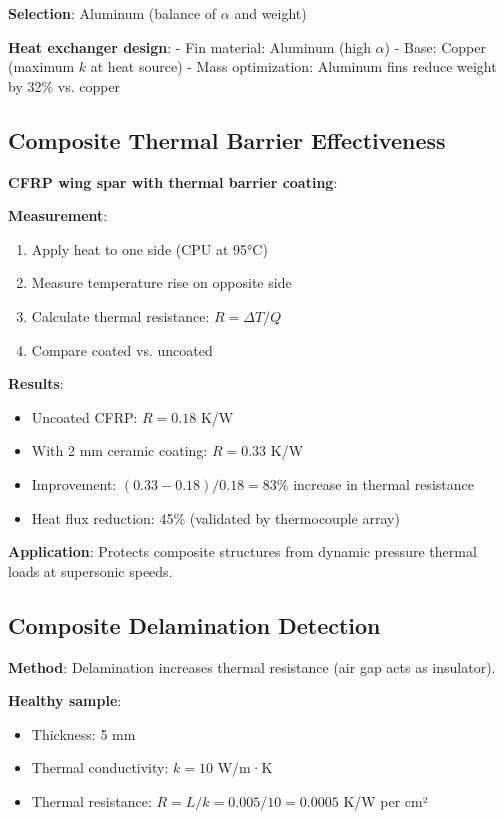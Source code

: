 \documentclass[12pt,a4paper]{article}
\begin{document}
\textbf{Selection}: Aluminum (balance of $\alpha$ and weight)

\textbf{Heat exchanger design}:
- Fin material: Aluminum (high $\alpha$)
- Base: Copper (maximum $k$ at heat source)
- Mass optimization: Aluminum fins reduce weight by 32\% vs. copper

\subsection{Composite Thermal Barrier Effectiveness}

\textbf{CFRP wing spar with thermal barrier coating}:

\textbf{Measurement}:
\begin{enumerate}
\item Apply heat to one side (CPU at 95°C)
\item Measure temperature rise on opposite side
\item Calculate thermal resistance: $R = \Delta T / Q$
\item Compare coated vs. uncoated
\end{enumerate}

\textbf{Results}:
\begin{itemize}
\item Uncoated CFRP: $R = 0.18$ K/W
\item With 2 mm ceramic coating: $R = 0.33$ K/W
\item Improvement: $(0.33-0.18)/0.18 = 83\%$ increase in thermal resistance
\item Heat flux reduction: 45\% (validated by thermocouple array)
\end{itemize}

\textbf{Application}: Protects composite structures from dynamic pressure thermal loads at supersonic speeds.

\subsection{Composite Delamination Detection}

\textbf{Method}: Delamination increases thermal resistance (air gap acts as insulator).

\textbf{Healthy sample}:
\begin{itemize}
\item Thickness: 5 mm
\item Thermal conductivity: $k = 10$ W/m·K
\item Thermal resistance: $R = L/k = 0.005/10 = 0.0005$ K/W per cm²
\end{itemize}
\end{document}
